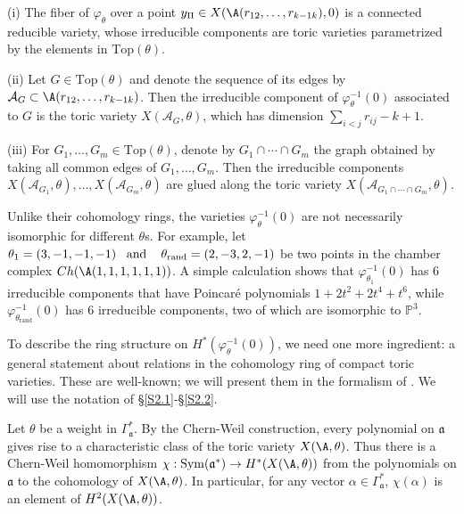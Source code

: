 \begin{prop}\label{toricfib}
	(i) The fiber of $\varphi_\theta$ over a point $y_\Pi\in 
	X(\A(r_{12}, \ldots ,r_{k-1 k}),0)$ is a connected reducible variety, 
	whose irreducible components are toric varieties parametrized by the 
	elements in $\mathrm{Top}(\theta)$. 
	
	(ii) Let $G\in\mathrm{Top}(\theta)$ and denote the sequence of its edges 
	by $\mathcal{A}_G\subset \A(r_{12}, \ldots ,r_{k-1 k})$. Then the irreducible 
	component of $\varphi_\theta^{-1}(0)$ associated to $G$ is the toric 
	variety  $X(\mathcal{A}_G,\theta)$, which has  dimension 
	$\sum_{i<j}r_{ij}-k+1$. 
	
	(iii) For $G_1, \ldots ,G_m\in\mathrm{Top}(\theta)$,  denote by $G_1\cap \cdots \cap 
	G_m$ the graph obtained by taking all common edges of $G_1, \ldots ,G_m$. Then 
	the  
	irreducible components  
	$X(\mathcal{A}_{G_1},\theta), \ldots ,X(\mathcal{A}_{G_m},\theta)$ are glued 
	along the toric variety $X(\mathcal{A}_{G_1\cap \cdots \cap G_m},\theta)$.
\end{prop}


\begin{rema}
	Unlike their cohomology rings, the varieties $\varphi_\theta^{-1}(0)$ are 
	not necessarily isomorphic for different $\theta$s. For example, let 
	$\theta_1 = (3,-1,-1,-1) \text{\,\,\, and \,\,\, } \theta_\mathrm{rand} = 
	(2,-3,2,-1)$ be two points in  the chamber complex $Ch(\A(1,1,1,1,1,1))$. A 
	simple calculation shows that $\varphi_{\theta_1}^{-1}(0)$ has 6 
	irreducible components that have Poincar\'e polynomials $1+2t^2+2t^4+t^6$, 
	while $\varphi_{\theta_\mathrm{rand}}^{-1}(0)$ has 6 irreducible 
	components, two of which are isomorphic to $\mathbb{P}^3$.
\end{rema}


To describe the ring structure on $H^*(\varphi_\theta^{-1}(0))$, we need one 
more ingredient: a general statement about relations in the cohomology 
ring of compact toric varieties. These are well-known; we will present them in 
the formalism of \cite{SzV}. We will use the notation of 
\S\ref{S2.1}-\S\ref{S2.2}.

Let $\theta$ be a weight in $\Gamma_{\mathfrak{a}}^*$. By the Chern-Weil 
construction, every polynomial on $\mathfrak{a}$ gives rise to a characteristic 
class of the toric variety $X(\A,\theta)$. Thus there is  a Chern-Weil 
homomorphism 
$\chi: \mathrm{Sym}(\mathfrak{a}^*)\to H^*(X(\A,\theta))$ from the polynomials 
on $\mathfrak{a}$ to the cohomology of $X(\A,\theta)$. In particular, for any 
vector $\alpha\in\Gamma_{\mathfrak{a}}^*$, $\chi(\alpha)$ is an element of 
$H^2(X(\A,\theta))$.





